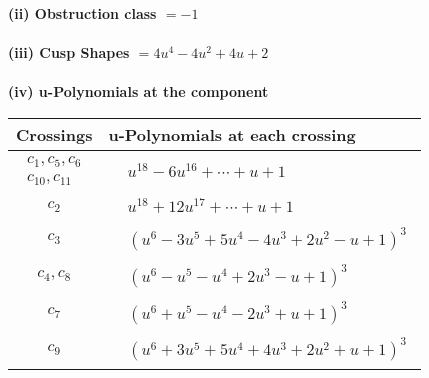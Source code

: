 \documentclass[1p]{elsarticle_modified}
\theoremstyle{definition}
\begin{document}
\flushleft \textbf{(ii) Obstruction class $= -1$}\\~\\
\flushleft \textbf{(iii) Cusp Shapes $= 4 u^4-4 u^2+4 u+2$}\\~\\
\newpage\renewcommand{\arraystretch}{1}
\flushleft \textbf{(iv) u-Polynomials at the component}\newline \\
\begin{tabular}{m{50pt}|m{274pt}}
Crossings & \hspace{64pt}u-Polynomials at each crossing \\
\hline $$\begin{aligned}c_{1},c_{5},c_{6}\\c_{10},c_{11}\end{aligned}$$&$\begin{aligned}
&u^{18}-6 u^{16}+\cdots+u+1
\end{aligned}$\\
\hline $$\begin{aligned}c_{2}\end{aligned}$$&$\begin{aligned}
&u^{18}+12 u^{17}+\cdots+u+1
\end{aligned}$\\
\hline $$\begin{aligned}c_{3}\end{aligned}$$&$\begin{aligned}
&(u^6-3 u^5+5 u^4-4 u^3+2 u^2- u+1)^3
\end{aligned}$\\
\hline $$\begin{aligned}c_{4},c_{8}\end{aligned}$$&$\begin{aligned}
&(u^6- u^5- u^4+2 u^3- u+1)^3
\end{aligned}$\\
\hline $$\begin{aligned}c_{7}\end{aligned}$$&$\begin{aligned}
&(u^6+u^5- u^4-2 u^3+u+1)^3
\end{aligned}$\\
\hline $$\begin{aligned}c_{9}\end{aligned}$$&$\begin{aligned}
&(u^6+3 u^5+5 u^4+4 u^3+2 u^2+u+1)^3
\end{aligned}$\\
\hline
\end{tabular}\\~\\
\end{document}

